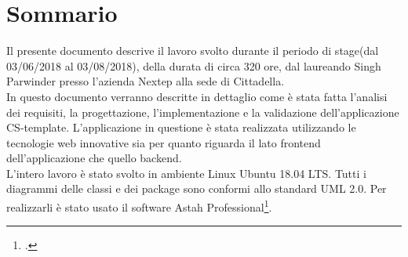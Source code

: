 
\cleardoublepage
{}
{}
\begingroup
\let\clearpage\relax
\let\cleardoublepage\relax
\let\cleardoublepage\relax

\chapter*{Sommario}
Il presente documento descrive il lavoro svolto durante il periodo di stage(dal 03/06/2018 al 03/08/2018), della durata di circa 320 ore, dal laureando Singh Parwinder presso l'azienda Nextep alla sede di Cittadella.
\\
In questo documento verranno descritte in dettaglio come è stata fatta  l'analisi dei requisiti, la progettazione, l'implementazione e la validazione dell'applicazione CS-template. L'applicazione in questione è stata realizzata utilizzando le tecnologie web innovative sia per quanto riguarda il lato frontend dell'applicazione che quello backend.\\
L'intero lavoro è stato svolto in ambiente Linux Ubuntu 18.04 LTS. Tutti i diagrammi delle classi e dei package sono conformi allo standard UML 2.0. Per realizzarli è stato usato il software Astah
Professional\footcite{http://astah.net/editions/professional}.  

%
%


